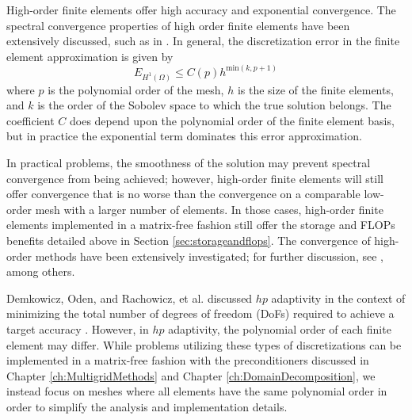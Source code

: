 High-order finite elements offer high accuracy and exponential convergence.
The spectral convergence properties of high order finite elements have been extensively discussed, such as in \cite{guo1986hp}.
In general, the discretization error in the finite element approximation is given by
\begin{equation}
E_{H^1 \left( \Omega \right)} \leq C \left( p \right) h^{\text{min} \left( k, p + 1 \right)}
\label{eq:spectral_convergence}
\end{equation}
where $p$ is the polynomial order of the mesh, $h$ is the size of the finite elements, and $k$ is the order of the Sobolev space to which the true solution belongs.
The coefficient $C$ does depend upon the polynomial order of the finite element basis, but in practice the exponential term dominates this error approximation.

In practical problems, the smoothness of the solution may prevent spectral convergence from being achieved; however, high-order finite elements will still offer convergence that is no worse than the convergence on a comparable low-order mesh with a larger number of elements.
In those cases, high-order finite elements implemented in a matrix-free fashion still offer the storage and FLOPs benefits detailed above in Section \ref{sec:storageandflops}.
The convergence of high-order methods have been extensively investigated; for further discussion, see \cite{babuska1982rates}, among others.

Demkowicz, Oden, and Rachowicz, et al. discussed $hp$ adaptivity in the context of minimizing the total number of degrees of freedom (DoFs) required to achieve a target accuracy \cite{demkowicz1989toward, oden1989toward, rachowicz1989toward}.
However, in $hp$ adaptivity, the polynomial order of each finite element may differ.
While problems utilizing these types of discretizations can be implemented in a matrix-free fashion with the preconditioners discussed in Chapter \ref{ch:MultigridMethods} and Chapter \ref{ch:DomainDecomposition}, we instead focus on meshes where all elements have the same polynomial order in order to simplify the analysis and implementation details.
